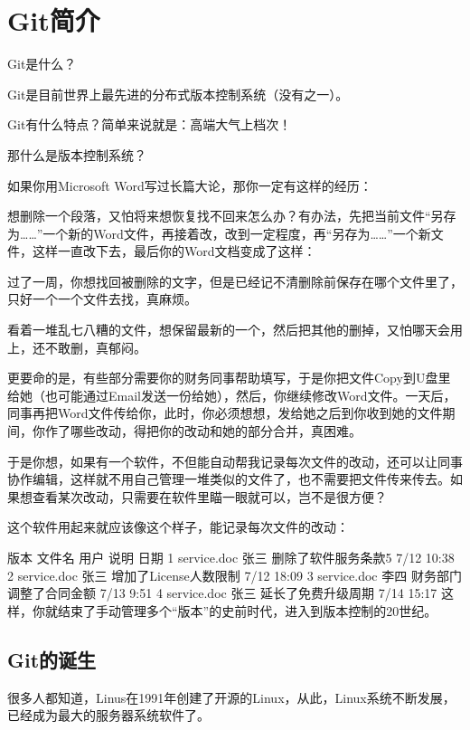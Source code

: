 
\chapter{Git简介}

Git是什么？

Git是目前世界上最先进的分布式版本控制系统（没有之一）。

Git有什么特点？简单来说就是：高端大气上档次！

那什么是版本控制系统？

如果你用Microsoft Word写过长篇大论，那你一定有这样的经历：

想删除一个段落，又怕将来想恢复找不回来怎么办？有办法，先把当前文件“另存为……”一个新的Word文件，再接着改，改到一定程度，再“另存为……”一个新文件，这样一直改下去，最后你的Word文档变成了这样：

过了一周，你想找回被删除的文字，但是已经记不清删除前保存在哪个文件里了，只好一个一个文件去找，真麻烦。

看着一堆乱七八糟的文件，想保留最新的一个，然后把其他的删掉，又怕哪天会用上，还不敢删，真郁闷。

更要命的是，有些部分需要你的财务同事帮助填写，于是你把文件Copy到U盘里给她（也可能通过Email发送一份给她），然后，你继续修改Word文件。一天后，同事再把Word文件传给你，此时，你必须想想，发给她之后到你收到她的文件期间，你作了哪些改动，得把你的改动和她的部分合并，真困难。

于是你想，如果有一个软件，不但能自动帮我记录每次文件的改动，还可以让同事协作编辑，这样就不用自己管理一堆类似的文件了，也不需要把文件传来传去。如果想查看某次改动，只需要在软件里瞄一眼就可以，岂不是很方便？

这个软件用起来就应该像这个样子，能记录每次文件的改动：

版本	文件名	用户	说明	日期
1	service.doc	张三	删除了软件服务条款5	7/12 10:38
2	service.doc	张三	增加了License人数限制	7/12 18:09
3	service.doc	李四	财务部门调整了合同金额	7/13 9:51
4	service.doc	张三	延长了免费升级周期	7/14 15:17
这样，你就结束了手动管理多个“版本”的史前时代，进入到版本控制的20世纪。

\section{Git的诞生}
很多人都知道，Linus在1991年创建了开源的Linux，从此，Linux系统不断发展，已经成为最大的服务器系统软件了。

